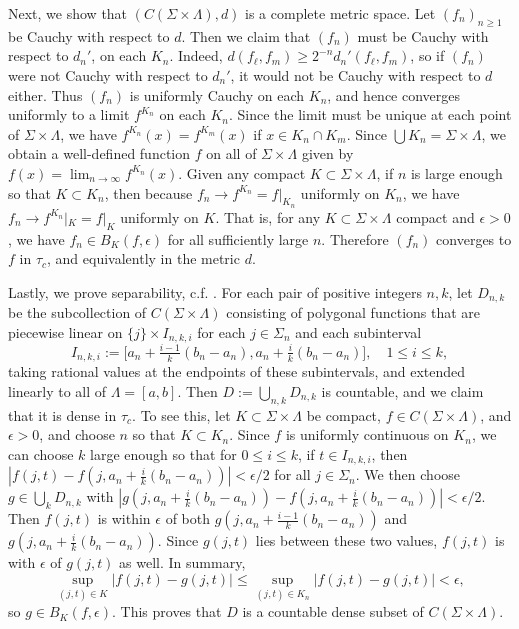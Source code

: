 Next, we show that $(C(\Sigma\times\Lambda), d)$ is a complete metric space. Let $(f_n)_{n\geq 1}$ be Cauchy with respect to $d$. Then we claim that $(f_n)$ must be Cauchy with respect to $d_n'$, on each $K_n$. Indeed, $d(f_\ell, f_m) \geq 2^{-n}d_n'(f_\ell, f_m)$, so if $(f_n)$ were not Cauchy with respect to $d_n'$, it would not be Cauchy with respect to $d$ either. Thus $(f_n)$ is uniformly Cauchy on each $K_n$, and hence converges uniformly to a limit $f^{K_n}$ on each $K_n$. Since the limit must be unique at each point of $\Sigma\times\Lambda$, we have $f^{K_n}(x) = f^{K_m}(x)$ if $x\in K_n\cap K_m$. Since $\bigcup K_n = \Sigma\times\Lambda$, we obtain a well-defined function $f$ on all of $\Sigma\times\Lambda$ given by $f(x)=\lim_{n\to\infty} f^{K_n}(x)$. Given any compact $K\subset \Sigma\times\Lambda$, if $n$ is large enough so that $K\subset K_n$, then because $f_n \to f^{K_n} = f|_{K_n}$ uniformly on $K_n$, we have $f_n \to f^{K_n}|_K = f|_K$ uniformly on $K$. That is, for any $K\subset\Sigma\times\Lambda$ compact and $\epsilon>0$, we have $f_n \in B_K(f,\epsilon)$ for all sufficiently large $n$. Therefore $(f_n)$ converges to $f$ in $\tau_c$, and equivalently in the metric $d$.

Lastly, we prove separability, c.f. \cite[Example 1.3]{Billing}. For each pair of positive integers $n,k$, let $D_{n,k}$ be the subcollection of $C(\Sigma\times\Lambda)$ consisting of polygonal functions that are piecewise linear on $\{j\}\times I_{n,k,i}$ for each $j\in\Sigma_n$ and each subinterval 
\[
I_{n,k,i} := \big[a_n+\tfrac{i-1}{k}(b_n-a_n), a_n+\tfrac{i}{k}(b_n-a_n)\big], \quad 1\leq i\leq k,
\] 
taking rational values at the endpoints of these subintervals, and extended linearly to all of $\Lambda = [a,b]$. Then $D := \bigcup_{n,k} D_{n,k}$ is countable, and we claim that it is dense in $\tau_c$. To see this, let $K\subset\Sigma\times\Lambda$ be compact, $f\in C(\Sigma\times\Lambda)$, and $\epsilon>0$, and choose $n$ so that $K\subset K_n$. Since $f$ is uniformly continuous on $K_n$, we can choose $k$ large enough so that for $0\leq i\leq k$, if $t\in I_{n,k,i}$, then $|f(j,t) - f(j, a_n + \frac{i}{k}(b_n-a_n))| < \epsilon/2$ for all $j\in\Sigma_n$. We then choose $g\in \bigcup_k D_{n,k}$ with $|g(j,a_n + \frac{i}{k}(b_n-a_n)) - f(j,a_n + \frac{i}{k}(b_n-a_n))| < \epsilon/2$. Then $f(j,t)$ is within $\epsilon$ of both $g(j,a_n + \frac{i-1}{k}(b_n-a_n))$ and $g(j,a_n + \frac{i}{k}(b_n-a_n))$. Since $g(j,t)$ lies between these two values, $f(j,t)$ is with $\epsilon$ of $g(j,t)$ as well. In summary,
\[
\sup_{(j,t)\in K} |f(j,t)-g(j,t)| \leq \sup_{(j,t)\in K_n} |f(j,t)-g(j,t)| < \epsilon,
\] 
so $g\in B_K(f,\epsilon)$. This proves that $D$ is a countable dense subset of $C(\Sigma\times\Lambda)$.


